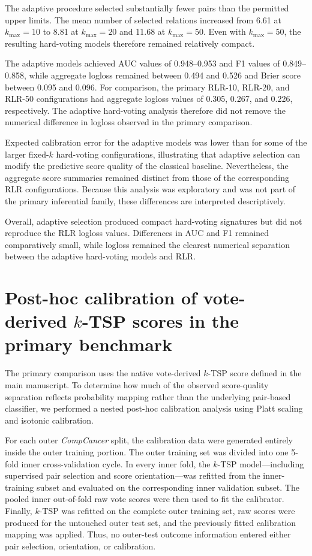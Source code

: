 \documentclass[11pt, a4paper]{article}
\begin{document}
The adaptive procedure selected substantially fewer pairs than the permitted upper limits. The mean number of selected relations increased from 6.61 at $k_{\max}=10$ to 8.81 at $k_{\max}=20$ and 11.68 at $k_{\max}=50$. Even with $k_{\max}=50$, the resulting hard-voting models therefore remained relatively compact.

The adaptive models achieved AUC values of 0.948--0.953 and F1 values of 0.849--0.858, while aggregate logloss remained between 0.494 and 0.526 and Brier score between 0.095 and 0.096. For comparison, the primary RLR-10, RLR-20, and RLR-50 configurations had aggregate logloss values of 0.305, 0.267, and 0.226, respectively. The adaptive hard-voting analysis therefore did not remove the numerical difference in logloss observed in the primary comparison.

Expected calibration error for the adaptive models was lower than for some of the larger fixed-$k$ hard-voting configurations, illustrating that adaptive selection can modify the predictive score quality of the classical baseline. Nevertheless, the aggregate score summaries remained distinct from those of the corresponding RLR configurations. Because this analysis was exploratory and was not part of the primary inferential family, these differences are interpreted descriptively.

Overall, adaptive selection produced compact hard-voting signatures but did not reproduce the RLR logloss values. Differences in AUC and F1 remained comparatively small, while logloss remained the clearest numerical separation between the adaptive hard-voting models and RLR.


\section{Post-hoc calibration of vote-derived $k$-TSP scores in the primary benchmark}
\label{sec:calibration_supp}

The primary comparison uses the native vote-derived $k$-TSP score defined in the main manuscript. To determine how much of the observed score-quality separation reflects probability mapping rather than the underlying pair-based classifier, we performed a nested post-hoc calibration analysis using Platt scaling and isotonic calibration.

For each outer \emph{CompCancer} split, the calibration data were generated entirely inside the outer training portion. The outer training set was divided into one 5-fold inner cross-validation cycle. In every inner fold, the $k$-TSP model---including supervised pair selection and score orientation---was refitted from the inner-training subset and evaluated on the corresponding inner validation subset. The pooled inner out-of-fold raw vote scores were then used to fit the calibrator. Finally, $k$-TSP was refitted on the complete outer training set, raw scores were produced for the untouched outer test set, and the previously fitted calibration mapping was applied. Thus, no outer-test outcome information entered either pair selection, orientation, or calibration.
\end{document}
